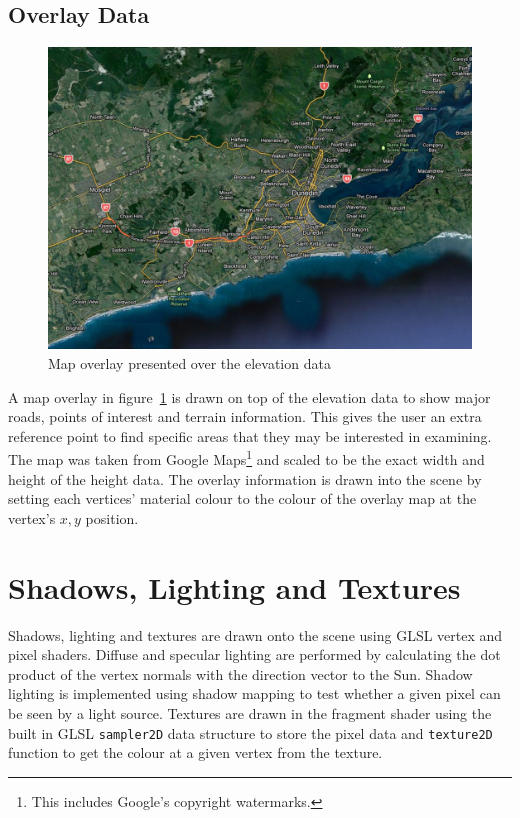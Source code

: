 \documentclass[12pt]{report}
\newcommand{\note}[1]{}
\newcommand{\notedme}[1]{}
\begin{document}
\subsection{Overlay Data}
\begin{figure}[h]
\centering
\includegraphics[scale=0.3]{suburbs.jpg}
\caption{Map overlay presented over the elevation data}
\label{image:overlay}
\end{figure}
A map overlay in figure~\ref{image:overlay} is drawn on top of the elevation data to show major roads, points of interest and terrain information. This gives the user an extra reference point to find specific areas that they may be interested in examining. The map was taken from Google Maps\footnote{This includes Google's copyright watermarks.} \cite{gmaps} and scaled to be the exact width and height of the height data. The overlay information is drawn into the scene by setting each vertices' material colour to the colour of the overlay map at the vertex's $x,y$ position.

\section{Shadows, Lighting and Textures}
Shadows, lighting and textures are drawn onto the scene using GLSL vertex and pixel shaders. Diffuse and specular lighting are performed by calculating the dot product of the vertex normals with the direction vector to the Sun. Shadow lighting is implemented using shadow mapping to test whether a given pixel can be seen by a light source. Textures are drawn in the fragment shader using the built in GLSL \texttt{sampler2D} data structure to store the pixel data and \texttt{texture2D} function to get the colour at a given vertex from the texture.\note{lowered density slightly}\notedme{?}\note{In your previous comment you said this section was a bit dense}\notedme{Oh OK. Yep it's good now!}
\end{document}
